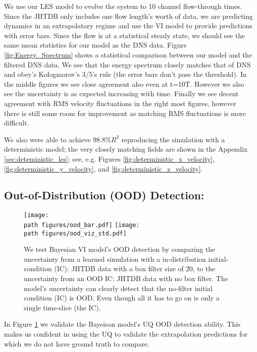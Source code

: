 We use our LES model to evolve the system to 10 channel flow-through times. Since the JHTDB only includes one flow length's worth of data, we are predicting dynamics in an extrapolatory regime and use the VI model to provide predictions with error bars. Since the flow is at a statistical steady state, we should see the same mean statistics for our model as the DNS data. Figure \ref{fig:Energy_Spectrum} shows a statistical comparison between our model and the filtered DNS data. We see that the energy spectrum closely matches that of DNS and obey's Kologmorov's 3/5's rule (the error bars don't pass the threshold). In the middle figures we see close agreement also even at t=10T. However we also see the uncertainty is as expected increasing with time. Finally we see decent agreement with RMS velocity fluctuations in the right most figures, however there is still some room for improvement as matching RMS fluctuations \cite{Pope_2000} is more difficult.

We also were able to achieve $98.8\% R^2$ reproducing the simulation with a deterministic model; the very closely matching fields are shown in the Appendix \ref{sec:deteministic_les}; see, e.g. Figures \ref{fig:deterministic_x_velocity},\ref{fig:deterministic_y_velocity}, and \ref{fig:deterministic_z_velocity}. %


\subsection{Out-of-Distribution (OOD) Detection:}

\begin{figure}
    \centering
    \texttt{[image: \\path figures/ood\_bar.pdf]}
    \hspace{.1in}
    \texttt{[image: \\path figures/ood\_viz\_std.pdf]}
    \caption{We test Bayesian VI model's OOD detection by comparing the uncertainty from a learned simulation with a in-distribution initial-condition (IC): JHTDB data with a box filter size of 20, to the uncertainty from an OOD IC: JHTDB data with no box filter. The model's uncertainty can clearly detect that the no-filter initial condition (IC) is OOD. Even though all it has to go on is only a single time-slice (the IC).}
    \label{fig:ood}
\end{figure}

In Figure \ref{fig:ood} we validate the Bayeisan model's UQ OOD detection ability. This makes us confident in using the UQ to validate the extrapolation predictions for which we do not have ground truth to compare.

 
